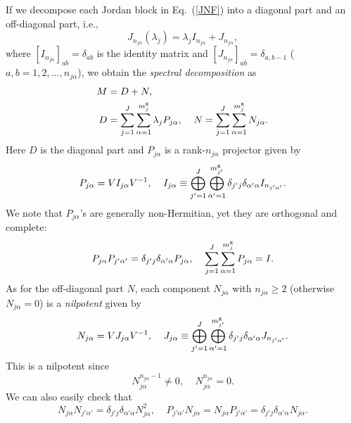 \documentclass{tADP2e}
\theoremstyle{plain}
\theoremstyle{plain}
\theoremstyle{definition}
\begin{document}
\vspace{3pt}
\noindent
If we decompose each Jordan block in Eq.~(\ref{JNF}) into a diagonal part and an off-diagonal part, i.e.,
\begin{equation}
J_{n_{j\alpha}}(\lambda_j)=\lambda_j I_{n_{j\alpha}}+J_{n_{j\alpha}},
\end{equation} 
where $[I_{n_{j\alpha}}]_{ab}=\delta_{ab}$ is the identity matrix and $[J_{n_{j\alpha}}]_{ab}=\delta_{a,b-1}$ ($a,b=1,2,...,n_{j\alpha}$), we obtain the \emph{spectral decomposition} as \cite{TK80}
\begin{equation}
\begin{split}
M&=D+N,\\
D&=\sum^J_{j=1}\sum^{m^{\rm g}_j}_{\alpha=1} \lambda_jP_{j\alpha},\;\;\;\;N=\sum^J_{j=1}\sum^{m^{\rm g}_j}_{\alpha=1} N_{j\alpha}.
\end{split}
\label{spedec}
\end{equation}
Here $D$ is the diagonal part and %
$P_{j\alpha}$ is a rank-$n_{j\alpha}$ projector given by
\begin{equation}\label{2_projector}
P_{j\alpha}=VI_{j\alpha}V^{-1},\;\;\;\;
I_{j\alpha}\equiv \bigoplus^J_{j'=1}\bigoplus^{m^{\rm g}_{j'}}_{\alpha'=1} \delta_{j'j}\delta_{\alpha'\alpha}I_{n_{j'\alpha'}}.
\end{equation}
We note that $P_{j\alpha}$'s are generally non-Hermitian, yet they are orthogonal and complete: \begin{equation}
P_{j\alpha}P_{j'\alpha'}=\delta_{j'j}\delta_{\alpha'\alpha}P_{j\alpha},\;\;\;\;
\sum^J_{j=1}\sum^{m^{\rm g}_j}_{\alpha=1}P_{j\alpha}=I.
\label{onp}
\end{equation}
As for the off-diagonal part $N$, each component $N_{j\alpha}$ with $n_{j\alpha}\ge2$ (otherwise $N_{j\alpha}=0$) is a \emph{nilpotent} given by 
\begin{equation}\label{2_nilpotent}
N_{j\alpha}=VJ_{j\alpha}V^{-1},\;\;\;\;
J_{j\alpha}\equiv \bigoplus^J_{j'=1}\bigoplus^{m^{\rm g}_{j'}}_{\alpha'=1} \delta_{j'j}\delta_{\alpha'\alpha}J_{n_{j'\alpha'}}.
\end{equation}
This is a nilpotent since
\begin{equation}
N_{j\alpha}^{n_{j\alpha}-1}\neq0,\;\;\;\;
N_{j\alpha}^{n_{j\alpha}}=0.
\label{nip}
\end{equation}
We can also easily check that 
\begin{equation}
N_{j\alpha}N_{j'\alpha'}=\delta_{j'j}\delta_{\alpha'\alpha}N_{j\alpha}^2,\;\;\;\;
P_{j'\alpha'}N_{j\alpha}=N_{j\alpha}P_{j'\alpha'}=\delta_{j'j}\delta_{\alpha'\alpha}N_{j\alpha}. 
\label{pn}
\end{equation} 
\end{document}
